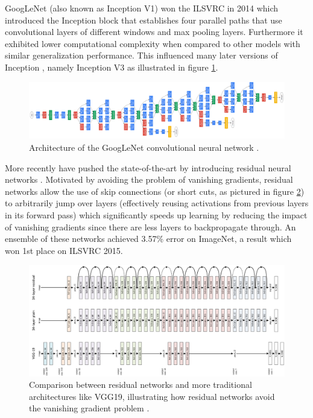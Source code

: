 GoogLeNet \cite{inceptionv1} (also known as Inception V1) won the \ac{ILSVRC} \cite{imagenet} in 2014 which introduced the Inception block that establishes four parallel paths that use convolutional layers of different windows and max pooling layers. Furthermore it exhibited lower computational complexity when compared to other models with similar generalization performance. This influenced many later versions of Inception \cite{inceptionv2_3}\cite{inceptionv4}, namely Inception V3 as illustrated in figure \ref{fig:inceptionv3}.

\begin{figure}[ht]
    \centering
    \includegraphics[width=1.0\textwidth]{figs/inceptionv1.png}
    \caption{Architecture of the GoogLeNet convolutional neural network \cite{inceptionv1}.}
    \label{fig:inceptionv3}
\end{figure}

More recently \citeauthor{resnet} have pushed the state-of-the-art by introducing residual neural networks \cite{resnet}. Motivated by avoiding the problem of vanishing gradients, residual networks allow the use of skip connections (or short cuts, as pictured in figure \ref{fig:resnet50}) to arbitrarily jump over layers (effectively reusing activations from previous layers in its forward pass) which significantly speeds up learning by reducing the impact of vanishing gradients since there are less layers to backpropagate through. An ensemble of these networks achieved 3.57\% error on ImageNet, a result which won 1st place on \ac{ILSVRC} 2015.

\begin{figure}[ht]
    \centering
    \includegraphics[width=1.0\textwidth]{figs/resnet50.png}
    \caption{Comparison between residual networks and more traditional architectures like VGG19, illustrating how residual networks avoid the vanishing gradient problem \cite{resnet}.}
    \label{fig:resnet50}
\end{figure}

